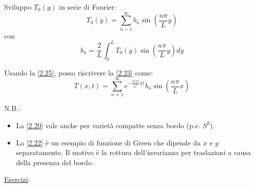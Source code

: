 \documentclass[a4paper,11pt]{report}
\begin{document}
Sviluppo $T_0(y)$ in serie di Fourier: 
\begin{equation}
T_0(y)=\sum_{n=1}^{\infty}b_n\sin{\left(\frac{n\pi}{L}y\right)}
\label{2.24}
\end{equation}
con 
\begin{equation}
b_n=\frac{2}{L}\int_0^LT_0(y)\sin{\left(\frac{n\pi}{L}y\right)} dy
\label{2.25}
\end{equation}

Usando la \eqref{2.25}, posso riscrivere la \eqref{2.23} come:
\begin{equation}
T(x,t)=\sum_{n=1}^{\infty}e^{-\frac{n^2\pi^2}{L^2}\chi t}b_n\sin{\left(\frac{n\pi}{L}x\right)}
\end{equation}

N.B.: 
\begin{itemize}
\item La \eqref{2.20} vale anche per variet\`a compatte senza bordo (p.e. $S^2$).
\item La \eqref{2.22} \`e un esempio di funzione di Green che dipende da $x$ e $y$ separatamente. Il motivo \`e la rottura dell'invarianza per traslazioni a causa della presenza del bordo.
\end{itemize}

\medskip

\underline{Esercizi}:
\end{document}
